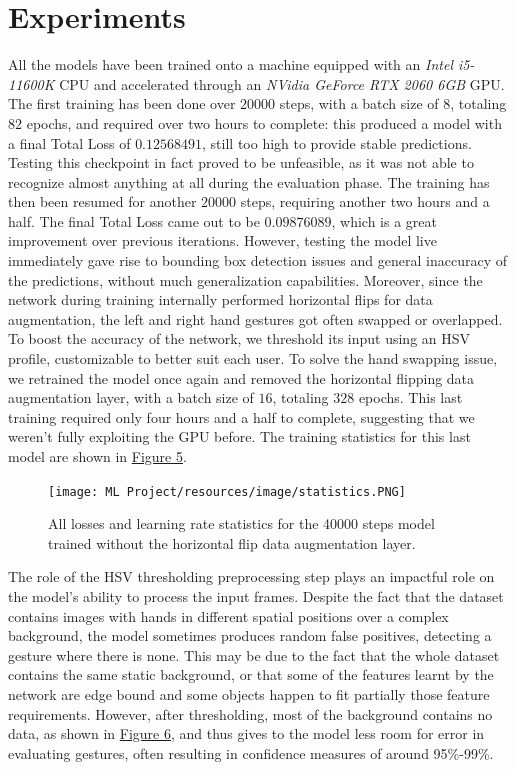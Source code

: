 \documentclass[a4paper, 12pt]{article}
\begin{document}
\section{Experiments}
\begin{flushleft}
All the models have been trained onto a machine equipped with an \textit{Intel i5-11600K} CPU and accelerated through an \textit{NVidia GeForce RTX 2060 6GB} GPU.
The first training has been done over $20000$ steps, with a batch size of $8$, totaling $82$ epochs, and required over two hours to complete: this produced a model with a final Total Loss of $0.12568491$, still too high to provide stable predictions. Testing this checkpoint in fact proved to be unfeasible, as it was not able to recognize almost anything at all during the evaluation phase.
The training has then been resumed for another $20000$ steps, requiring another two hours and a half. The final Total Loss came out to be $0.09876089$, which is a great improvement over previous iterations. However, testing the model live immediately gave rise to bounding box detection issues and general inaccuracy of the predictions, without much generalization capabilities. Moreover, since the network during training internally performed horizontal flips for data augmentation, the left and right hand gestures got often swapped or overlapped. To boost the accuracy of the network, we threshold its input using an HSV profile, customizable to better suit each user.
To solve the hand swapping issue, we retrained the model once again and removed the horizontal flipping data augmentation layer, with a batch size of $16$, totaling $328$ epochs. This last training required only four hours and a half to complete, suggesting that we weren't fully exploiting the GPU before.
The training statistics for this last model are shown in \hyperref[figure5]{Figure 5}.
\begin{figure}[!h]
    \centering
    \texttt{[image: ML Project/resources/image/statistics.PNG]} \caption{All losses and learning rate statistics for the 40000 steps model trained without the horizontal flip data augmentation layer.}
\end{figure}
\label{figure5}
The role of the HSV thresholding preprocessing step plays an impactful role on the model's ability to process the input frames. Despite the fact that the dataset contains images with hands in different spatial positions over a complex background, the model sometimes produces random false positives, detecting a gesture where there is none. This may be due to the fact that the whole dataset contains the same static background, or that some of the features learnt by the network are edge bound and some objects happen to fit partially those feature requirements. However, after thresholding, most of the background contains no data, as shown in \hyperref[figure6]{Figure 6}, and thus gives to the model less room for error in evaluating gestures, often resulting in confidence measures of around 95\%-99\%.


\end{flushleft}
\end{document}
